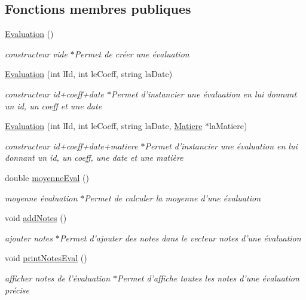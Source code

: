 \subsection*{Fonctions membres publiques}
\begin{DoxyCompactItemize}
\item 
\hyperlink{class_evaluation_af7b959b9a214ba6bd0ecc65324d9fe12}{Evaluation} ()
\begin{DoxyCompactList}\small\item\em constructeur vide $\ast$\-Permet de créer une évaluation \end{DoxyCompactList}\item 
\hyperlink{class_evaluation_ac314d2138cbce24223f66ce52d3fab51}{Evaluation} (int l\-Id, int le\-Coeff, string la\-Date)
\begin{DoxyCompactList}\small\item\em constructeur id+coeff+date $\ast$\-Permet d'instancier une évaluation en lui donnant un id, un coeff et une date \end{DoxyCompactList}\item 
\hyperlink{class_evaluation_a9d8bd540b9c6bf9f0f29b66c33384785}{Evaluation} (int l\-Id, int le\-Coeff, string la\-Date, \hyperlink{class_matiere}{Matiere} $\ast$la\-Matiere)
\begin{DoxyCompactList}\small\item\em constructeur id+coeff+date+matiere $\ast$\-Permet d'instancier une évaluation en lui donnant un id, un coeff, une date et une matière \end{DoxyCompactList}\item 
double \hyperlink{class_evaluation_ab51c8ccf98e731b48c7d12586b0cdfab}{moyenne\-Eval} ()
\begin{DoxyCompactList}\small\item\em moyenne évaluation $\ast$\-Permet de calculer la moyenne d'une évaluation \end{DoxyCompactList}\item 
void \hyperlink{class_evaluation_ac1b064b52d0a8527d046130a0c352743}{add\-Notes} ()
\begin{DoxyCompactList}\small\item\em ajouter notes $\ast$\-Permet d'ajouter des notes dans le vecteur notes d'une évaluation \end{DoxyCompactList}\item 
void \hyperlink{class_evaluation_aa9a018cc4136e5aba6a73dcfaaf88d8a}{print\-Notes\-Eval} ()
\begin{DoxyCompactList}\small\item\em afficher notes de l'évaluation $\ast$\-Permet d'affiche toutes les notes d'une évaluation précise \end{DoxyCompactList}\item 

\end{DoxyCompactItemize}
